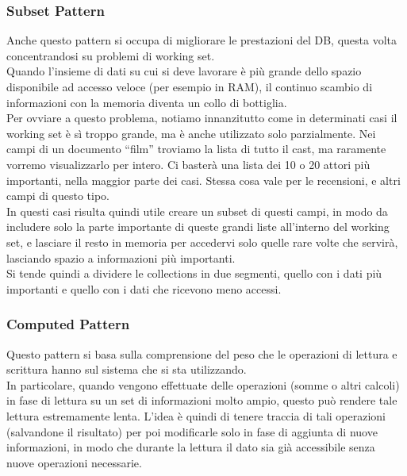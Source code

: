 \subsubsection{Subset Pattern}
Anche questo pattern si occupa di migliorare le prestazioni del DB, questa volta concentrandosi su problemi di working set.\\
Quando l'insieme di dati su cui si deve lavorare è più grande dello spazio disponibile ad accesso veloce (per esempio in RAM), il continuo scambio di informazioni con la memoria diventa un collo di bottiglia.\\
Per ovviare a questo problema, notiamo innanzitutto come in determinati casi il working set è sì troppo grande, ma è anche utilizzato solo parzialmente. Nei campi di un documento ``film'' troviamo la lista di tutto il cast, ma raramente vorremo visualizzarlo per intero. Ci basterà una lista dei 10 o 20 attori più importanti, nella maggior parte dei casi. Stessa cosa vale per le recensioni, e altri campi di questo tipo.\\
In questi casi risulta quindi utile creare un subset di questi campi, in modo da includere solo la parte importante di queste grandi liste all'interno del working set, e lasciare il resto in memoria per accedervi solo quelle rare volte che servirà, lasciando spazio a informazioni più importanti.\\
Si tende quindi a dividere le collections in due segmenti, quello con i dati più importanti e quello con i dati che ricevono meno accessi.\\

\subsubsection{Computed Pattern}
Questo pattern si basa sulla comprensione del peso che le operazioni di lettura e scrittura hanno sul sistema che si sta utilizzando.\\
In particolare, quando vengono effettuate delle operazioni (somme o altri calcoli) in fase di lettura su un set di informazioni molto ampio, questo può rendere tale lettura estremamente lenta. L'idea è quindi di tenere traccia di tali operazioni (salvandone il risultato) per poi modificarle solo in fase di aggiunta di nuove informazioni, in modo che durante la lettura il dato sia già accessibile senza nuove operazioni necessarie.\\

